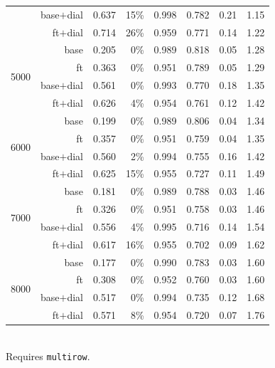 \begin{table}[t]
\begin{tabular}{lrrrrrrr}
     & base$+$dial & 0.637 & 15\% & 0.998 & 0.782 & 0.21 & 1.15 \\
     & ft$+$dial & 0.714 & 26\% & 0.959 & 0.771 & 0.14 & 1.22 \\
    \midrule
    \multirow{4}{*}{5000} & base & 0.205 & 0\% & 0.989 & 0.818 & 0.05 & 1.28 \\
     & ft & 0.363 & 0\% & 0.951 & 0.789 & 0.05 & 1.29 \\
     & base$+$dial & 0.561 & 0\% & 0.993 & 0.770 & 0.18 & 1.35 \\
     & ft$+$dial & 0.626 & 4\% & 0.954 & 0.761 & 0.12 & 1.42 \\
    \midrule
    \multirow{4}{*}{6000} & base & 0.199 & 0\% & 0.989 & 0.806 & 0.04 & 1.34 \\
     & ft & 0.357 & 0\% & 0.951 & 0.759 & 0.04 & 1.35 \\
     & base$+$dial & 0.560 & 2\% & 0.994 & 0.755 & 0.16 & 1.42 \\
     & ft$+$dial & 0.625 & 15\% & 0.955 & 0.727 & 0.11 & 1.49 \\
    \midrule
    \multirow{4}{*}{7000} & base & 0.181 & 0\% & 0.989 & 0.788 & 0.03 & 1.46 \\
     & ft & 0.326 & 0\% & 0.951 & 0.758 & 0.03 & 1.46 \\
     & base$+$dial & 0.556 & 4\% & 0.995 & 0.716 & 0.14 & 1.54 \\
     & ft$+$dial & 0.617 & 16\% & 0.955 & 0.702 & 0.09 & 1.62 \\
    \midrule
    \multirow{4}{*}{8000} & base & 0.177 & 0\% & 0.990 & 0.783 & 0.03 & 1.60 \\
     & ft & 0.308 & 0\% & 0.952 & 0.760 & 0.03 & 1.60 \\
     & base$+$dial & 0.517 & 0\% & 0.994 & 0.735 & 0.12 & 1.68 \\
     & ft$+$dial & 0.571 & 8\% & 0.954 & 0.720 & 0.07 & 1.76 \\
    \bottomrule
  \end{tabular}
  \vspace{2pt}\\ \footnotesize Requires \texttt{multirow}.
\end{table}
